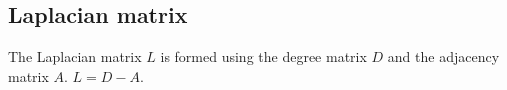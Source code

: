 
\subsection{Laplacian matrix}

The Laplacian matrix \(L\) is formed using the degree matrix \(D\) and the adjacency matrix \(A\). \(L=D-A\).

